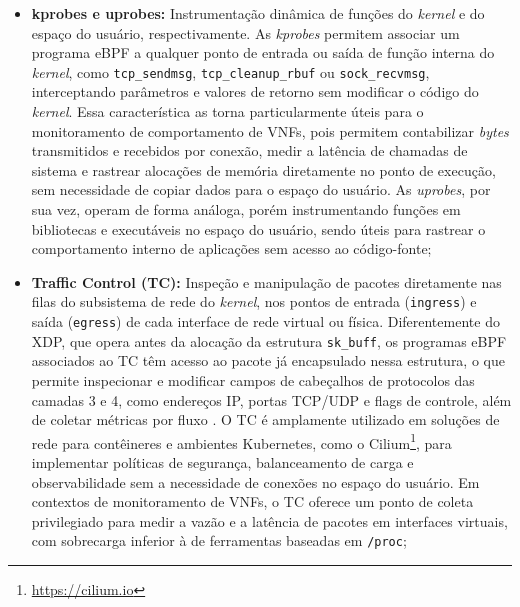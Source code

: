 \begin{itemize}
    \item \textbf{kprobes e uprobes:} Instrumentação dinâmica de funções do \textit{kernel} e do espaço do usuário, respectivamente. As \textit{kprobes} permitem associar um programa eBPF a qualquer ponto de entrada ou saída de função interna do \textit{kernel}, como \texttt{tcp\_sendmsg}, \texttt{tcp\_cleanup\_rbuf} ou \texttt{sock\_recvmsg}, interceptando parâmetros e valores de retorno sem modificar o código do \textit{kernel}. Essa característica as torna particularmente úteis para o monitoramento de comportamento de VNFs, pois permitem contabilizar \textit{bytes} transmitidos e recebidos por conexão, medir a latência de chamadas de sistema e rastrear alocações de memória diretamente no ponto de execução, sem necessidade de copiar dados para o espaço do usuário. As \textit{uprobes}, por sua vez, operam de forma análoga, porém instrumentando funções em bibliotecas e executáveis no espaço do usuário, sendo úteis para rastrear o comportamento interno de aplicações sem acesso ao código-fonte;

    \item \textbf{Traffic Control (TC):} Inspeção e manipulação de pacotes diretamente nas filas do subsistema de rede do \textit{kernel}, nos pontos de entrada (\texttt{ingress}) e saída (\texttt{egress}) de cada interface de rede virtual ou física. Diferentemente do XDP, que opera antes da alocação da estrutura \texttt{sk\_buff}, os programas eBPF associados ao TC têm acesso ao pacote já encapsulado nessa estrutura, o que permite inspecionar e modificar campos de cabeçalhos de protocolos das camadas 3 e 4, como endereços IP, portas TCP/UDP e flags de controle, além de coletar métricas por fluxo \cite{10.1145/3594255.3594256}. O TC é amplamente utilizado em soluções de rede para contêineres e ambientes Kubernetes, como o Cilium\footnote{\url{https://cilium.io}}, para implementar políticas de segurança, balanceamento de carga e observabilidade sem a necessidade de conexões no espaço do usuário. Em contextos de monitoramento de VNFs, o TC oferece um ponto de coleta privilegiado para medir a vazão e a latência de pacotes em interfaces virtuais, com sobrecarga inferior à de ferramentas baseadas em \texttt{/proc};


\end{itemize}
